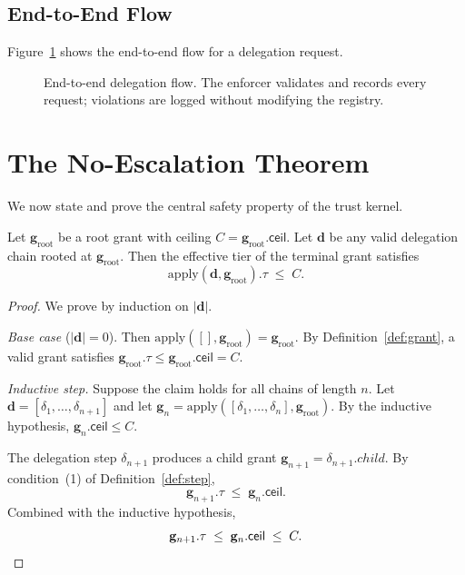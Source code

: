 \documentclass[11pt]{article}
\newcommand{\AGrant}{\mathbf{g}}            %
\newcommand{\ACeil}{\mathsf{ceil}}          %
\newcommand{\ARoot}{\mathbf{g}_{\mathrm{root}}} %
\newcommand{\DChain}{\mathbf{d}}            %
\newcommand{\DApply}{\mathrm{apply}}        %
\begin{document}
\subsection{End-to-End Flow}

Figure~\ref{fig:flow} shows the end-to-end flow for a delegation
request.

\begin{figure}[h]
\centering
{}
\caption{End-to-end delegation flow.  The enforcer validates and
  records every request; violations are logged without modifying
  the registry.}
\label{fig:flow}
\end{figure}

\section{The No-Escalation Theorem}\label{sec:noescalation}

We now state and prove the central safety property of the trust kernel.

\begin{theorem}[No-Escalation]\label{thm:no-escalation}
Let $\ARoot$ be a root grant with ceiling $C = \ARoot.\ACeil$.
Let $\DChain$ be any valid delegation chain rooted at $\ARoot$.
Then the effective tier of the terminal grant satisfies
\[
  \DApply(\DChain, \ARoot).\tau \;\leq\; C.
\]
\end{theorem}
\begin{proof}
We prove by induction on $|\DChain|$.

\medskip\noindent\textit{Base case} ($|\DChain| = 0$).
Then $\DApply([], \ARoot) = \ARoot$.  By Definition~\ref{def:grant},
a valid grant satisfies $\ARoot.\tau \leq \ARoot.\ACeil = C$.

\medskip\noindent\textit{Inductive step.}
Suppose the claim holds for all chains of length $n$.  Let
$\DChain = [\delta_1, \ldots, \delta_{n+1}]$ and let
$\AGrant_n = \DApply([\delta_1,\ldots,\delta_n], \ARoot)$.
By the inductive hypothesis, $\AGrant_n.\ACeil \leq C$.

The delegation step $\delta_{n+1}$ produces a child grant
$\AGrant_{n+1} = \delta_{n+1}.\mathit{child}$.  By
condition~(1) of Definition~\ref{def:step},
\[
  \AGrant_{n+1}.\tau \;\leq\; \AGrant_n.\ACeil.
\]
Combined with the inductive hypothesis,
\[
  \AGrant_{n+1}.\tau \;\leq\; \AGrant_n.\ACeil \;\leq\; C. \qedhere
\]
\end{proof}
\end{document}

